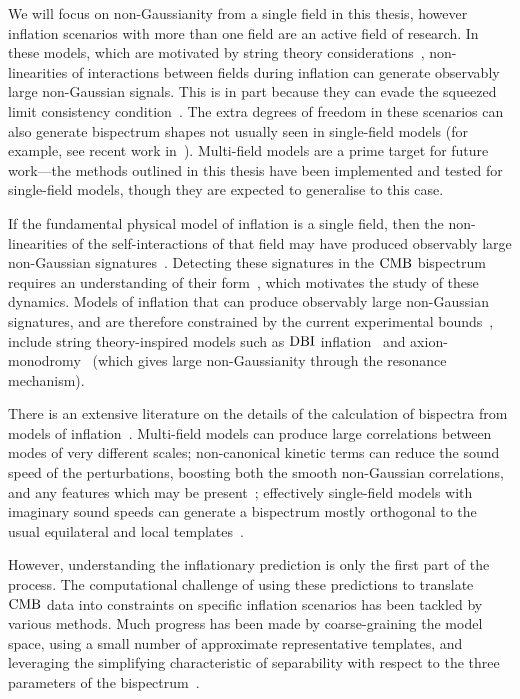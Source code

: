 We will focus on non-Gaussianity from a single field in this thesis,
however inflation scenarios with more than one field are an
active field of research.
In these models, which are motivated by string theory considerations~\cite{achucarro_multifield1},
non-linearities of interactions between fields during inflation
can generate observably large non-Gaussian signals.
This is in part because they can evade the squeezed limit consistency condition~\cite{sqz_consistency}.
The extra degrees of freedom in these scenarios can also generate bispectrum shapes not usually
seen in single-field models (for example, see recent work in~\cite{RP_2, Fumagalli_2019}).
Multi-field models are a prime target for future work---the
methods outlined in this thesis have been implemented
and tested for single-field models,
though they are expected to generalise to this case.


If the fundamental physical model of inflation is a single field,
then the non-linearities of the self-interactions of that field may have
produced observably large non-Gaussian signatures~\cite{Tolley_2010, achucarro_eft}.
Detecting these signatures in the $\text{CMB}$ bispectrum requires an understanding
of their form~\cite{Komatsu_2005}, which motivates the study of these dynamics.
Models of inflation that can produce observably large non-Gaussian signatures,
and are therefore constrained by the current experimental bounds~\cite{Planck_NG_2018},
include string theory-inspired models such as $\text{DBI}$ inflation~\cite{dbi_silverstein}
and axion-monodromy~\cite{axion_monodr_review_09, Flauger_2014}
(which gives large non-Gaussianity through the resonance mechanism).


There is an extensive literature on the details of the calculation
of bispectra from models of inflation~\cite{chen_easther_lim_1,chen_easther_lim_2,chen_ng_0605,seery_ng_0503,px_burrage,adshead,flauger_pajer_resonant,features_bartolo,bdy_passaglia}.
Multi-field models can produce large
correlations between modes of very different scales;
non-canonical kinetic terms can reduce the sound speed of the perturbations,
boosting both the smooth non-Gaussian correlations, and any
features which may be present~\cite{dbi_adshead,dbi_in_the_sky,warp_features_dbi,dbi_silverstein,dbi_step_miranda,chen_folded_resonant,osc_avila};
effectively single-field models with imaginary sound speeds can generate a bispectrum
mostly orthogonal to the usual equilateral and local templates~\cite{RP_1}.


However, understanding the inflationary prediction is only the first part of the process.
The computational challenge of using these predictions to translate
$\text{CMB}$ data into constraints on specific inflation scenarios has been tackled by
various methods.
Much progress has been made by coarse-graining
the model space, using a small number of approximate representative templates,
and leveraging the simplifying characteristic of separability
with respect to the three parameters of the bispectrum~\cite{Komatsu_2005, Munchmeyer_2014}.


